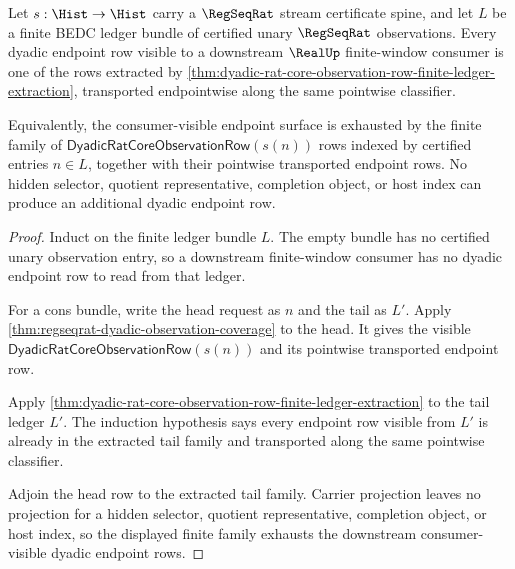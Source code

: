\begin{theorem}
\label{thm:regseqrat-observation-ledger-dyadic-endpoint-coverage}
Let $s:\Hist\to\Hist$ carry a $\RegSeqRat$ stream certificate spine, and let
$L$ be a finite BEDC ledger bundle of certified unary $\RegSeqRat$
observations. Every dyadic endpoint row visible to a downstream $\RealUp$
finite-window consumer is one of the rows extracted by
\autoref{thm:dyadic-rat-core-observation-row-finite-ledger-extraction},
transported endpointwise along the same pointwise classifier.

Equivalently, the consumer-visible endpoint surface is exhausted by the finite
family of $\mathsf{DyadicRatCoreObservationRow}(s(n))$ rows indexed by
certified entries $n\in L$, together with their pointwise transported endpoint
rows. No hidden selector, quotient representative, completion object, or host
index can produce an additional dyadic endpoint row.
\end{theorem}
\begin{proof}
Induct on the finite ledger bundle $L$. The empty bundle has no certified unary
observation entry, so a downstream finite-window consumer has no dyadic endpoint
row to read from that ledger.

For a cons bundle, write the head request as $n$ and the tail as $L'$. Apply
\autoref{thm:regseqrat-dyadic-observation-coverage} to the head. It gives the
visible $\mathsf{DyadicRatCoreObservationRow}(s(n))$ and its pointwise
transported endpoint row.

Apply
\autoref{thm:dyadic-rat-core-observation-row-finite-ledger-extraction} to the
tail ledger $L'$. The induction hypothesis says every endpoint row visible from
$L'$ is already in the extracted tail family and transported along the same
pointwise classifier.

Adjoin the head row to the extracted tail family. Carrier projection leaves no
projection for a hidden selector, quotient representative, completion object, or
host index, so the displayed finite family exhausts the downstream
consumer-visible dyadic endpoint rows.
\end{proof}

